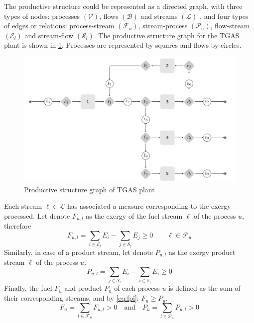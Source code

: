\documentclass{ecos2018}
\begin{document}
The productive structure could be represented as a directed graph, with three types of nodes: processes $(\mathcal{V})$, flows $(\mathcal{B})$ and streams $(\mathcal{L})$ , and four types of edges or relations: process-stream  $(\mathcal{F}_u)$, stream-process $(\mathcal{P}_u)$, flow-stream $(\mathcal{E}_l)$ and stream-flow $(\mathcal{S}_l)$. The productive structure graph for the TGAS plant is shown in \cref{tgasfp}. Processes are represented by squares and flows by circles.

\begin{figure}[htpb]
	\centering
	\includegraphics[width=0.90\linewidth]{tgasfp1}
	\caption{Productive structure graph of TGAS plant}
	\label{tgasfp}
\end{figure}

Each stream $\ell \in \mathcal{L}$ has associated a measure corresponding to the exergy processed. Let denote $F_{u,l}$ as the exergy of the fuel stream $\ell$ of the process $u$, therefore
\begin{equation}
F_{u,l} = \sum_{i\in\mathcal{E}_l} E_i - \sum_{j\in\mathcal{S}_l} E_j \ge 0 \qquad \ell\in\mathcal{F}_u
\label{eq:fs}
\end{equation}
\label{eq2_3}
Similarly, in case of a product stream, let denote  $P_{u,l}$ as the exergy  product stream $\ell$ of the process $u$.
\begin{equation}
P_{u,l}=\sum_{j\in\mathcal{S}_l} E_i - \sum_{i\in\mathcal{E}_l} E_i \ge 0
\label{eq:ps}
\end{equation}
Finally, the fuel $F_u$ and product $P_u$ of each process $u$ is defined as the sum of their corresponding streams, and by \cref{eq:fpi}: $F_u \ge P_u$. 
\begin{equation}
F_u=\sum_{l\in\mathcal{F}_u} F_{u,l} > 0 \quad\text{and} \quad P_u=\sum_{l\in\mathcal{P}_u} P_{u,l} > 0
\end{equation}
\end{document}
